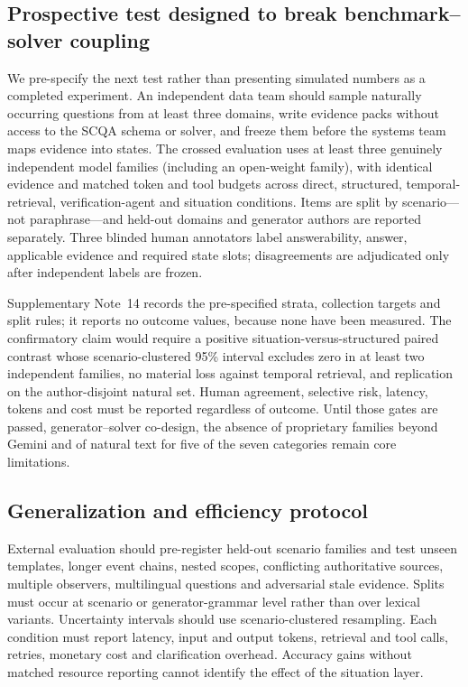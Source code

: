 \documentclass[Numbered]{sn-jnl}
\begin{document}
\subsection*{Prospective test designed to break benchmark--solver coupling}

We pre-specify the next test rather than presenting simulated numbers as a
completed experiment. An independent data team should sample naturally
occurring questions from at least three domains, write evidence packs without
access to the SCQA schema or solver, and freeze them before the systems team
maps evidence into states. The crossed evaluation uses at least three genuinely
independent model families (including an open-weight family), with identical
evidence and matched token and tool budgets across direct, structured,
temporal-retrieval, verification-agent and situation conditions. Items are
split by scenario---not paraphrase---and held-out domains and generator authors
are reported separately. Three blinded human annotators label answerability,
answer, applicable evidence and required state slots; disagreements are
adjudicated only after independent labels are frozen.

Supplementary Note~14 records the pre-specified strata, collection targets and
split rules; it reports no outcome values, because none have been measured. The
confirmatory claim would require a positive
situation-versus-structured paired contrast whose scenario-clustered 95\%
interval excludes zero in at least two independent families, no material loss
against temporal retrieval, and replication on the author-disjoint natural
set. Human agreement, selective risk, latency, tokens and cost must be reported
regardless of outcome. Until those gates are passed, generator--solver
co-design, the absence of proprietary families beyond Gemini and of natural
text for five of the seven categories remain core limitations.

\subsection*{Generalization and efficiency protocol}

External evaluation should pre-register held-out scenario families and test
unseen templates, longer event chains, nested scopes, conflicting authoritative
sources, multiple observers, multilingual questions and adversarial stale
evidence. Splits must occur at scenario or generator-grammar level rather than
over lexical variants. Uncertainty intervals should use scenario-clustered
resampling. Each condition must report latency, input and output tokens,
retrieval and tool calls, retries, monetary cost and clarification overhead.
Accuracy gains without matched resource reporting cannot identify the effect of
the situation layer.
\end{document}
